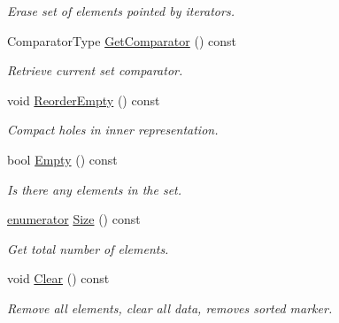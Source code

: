 \begin{DoxyCompactItemize}
\begin{DoxyCompactList}\small\item\em Erase set of elements pointed by iterators. \end{DoxyCompactList}\item 
\hypertarget{classINMOST_1_1ElementSet_a9a01902cdfb305404da949ec26bada4f}{Comparator\-Type \hyperlink{classINMOST_1_1ElementSet_a9a01902cdfb305404da949ec26bada4f}{Get\-Comparator} () const }\label{classINMOST_1_1ElementSet_a9a01902cdfb305404da949ec26bada4f}

\begin{DoxyCompactList}\small\item\em Retrieve current set comparator. \end{DoxyCompactList}\item 
\hypertarget{classINMOST_1_1ElementSet_a4315de813986b2824dbc7aedb15c6624}{void \hyperlink{classINMOST_1_1ElementSet_a4315de813986b2824dbc7aedb15c6624}{Reorder\-Empty} () const }\label{classINMOST_1_1ElementSet_a4315de813986b2824dbc7aedb15c6624}

\begin{DoxyCompactList}\small\item\em Compact holes in inner representation. \end{DoxyCompactList}\item 
\hypertarget{classINMOST_1_1ElementSet_a2bcfc456bd891780f082f054ccb2c301}{bool \hyperlink{classINMOST_1_1ElementSet_a2bcfc456bd891780f082f054ccb2c301}{Empty} () const }\label{classINMOST_1_1ElementSet_a2bcfc456bd891780f082f054ccb2c301}

\begin{DoxyCompactList}\small\item\em Is there any elements in the set. \end{DoxyCompactList}\item 
\hypertarget{classINMOST_1_1ElementSet_a58214190b41f9ed069ff37c0a49281c9}{\hyperlink{classINMOST_1_1Storage_ae333dfced6fa9cfde0c8e7dcf1b0cc2b}{enumerator} \hyperlink{classINMOST_1_1ElementSet_a58214190b41f9ed069ff37c0a49281c9}{Size} () const }\label{classINMOST_1_1ElementSet_a58214190b41f9ed069ff37c0a49281c9}

\begin{DoxyCompactList}\small\item\em Get total number of elements. \end{DoxyCompactList}\item 
\hypertarget{classINMOST_1_1ElementSet_a70f53036c6119d8c163cd27e1e5758d7}{void \hyperlink{classINMOST_1_1ElementSet_a70f53036c6119d8c163cd27e1e5758d7}{Clear} () const }\label{classINMOST_1_1ElementSet_a70f53036c6119d8c163cd27e1e5758d7}

\begin{DoxyCompactList}\small\item\em Remove all elements, clear all data, removes sorted marker. \end{DoxyCompactList}\end{DoxyCompactItemize}
